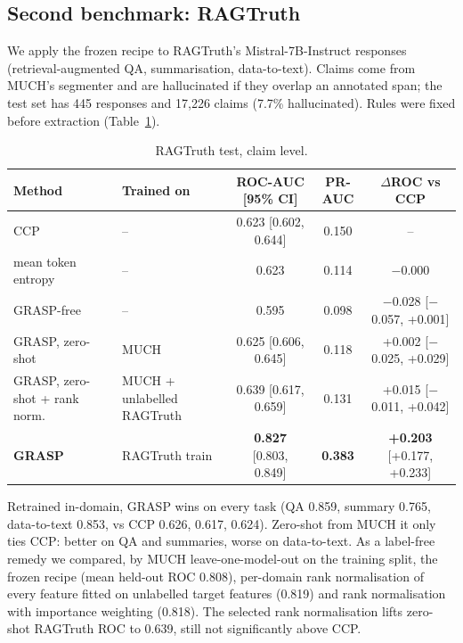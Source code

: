 \documentclass[11pt]{article}
\begin{document}
\subsection{Second benchmark: RAGTruth}
We apply the frozen recipe to RAGTruth's Mistral-7B-Instruct responses (retrieval-augmented QA,
summarisation, data-to-text). Claims come from MUCH's segmenter and are hallucinated if they overlap
an annotated span; the test set has 445 responses and 17,226 claims (7.7\% hallucinated). Rules were
fixed before extraction (Table~\ref{tab:rag}).
\begin{table}[h]
\centering\small
\begin{tabular}{llccc}
\toprule
Method & Trained on & ROC-AUC [95\% CI] & PR-AUC & $\Delta$ROC vs CCP \\
\midrule
CCP & -- & 0.623 [0.602, 0.644] & 0.150 & -- \\
mean token entropy & -- & 0.623 & 0.114 & $-$0.000 \\
GRASP-free & -- & 0.595 & 0.098 & $-$0.028 [$-$0.057, +0.001] \\
GRASP, zero-shot & MUCH & 0.625 [0.606, 0.645] & 0.118 & +0.002 [$-$0.025, +0.029] \\
GRASP, zero-shot + rank norm. & MUCH + unlabelled RAGTruth & 0.639 [0.617, 0.659] & 0.131 & +0.015 [$-$0.011, +0.042] \\
\textbf{GRASP} & RAGTruth train & \textbf{0.827} [0.803, 0.849] & \textbf{0.383} & \textbf{+0.203} [+0.177, +0.233] \\
\bottomrule
\end{tabular}
\caption{RAGTruth test, claim level.}
\label{tab:rag}
\end{table}
Retrained in-domain, GRASP wins on every task (QA 0.859, summary 0.765, data-to-text 0.853, vs
CCP 0.626, 0.617, 0.624). Zero-shot from MUCH it only ties CCP: better on QA and summaries, worse
on data-to-text. As a label-free remedy we compared, by MUCH leave-one-model-out on the training
split, the frozen recipe (mean held-out ROC 0.808), per-domain rank normalisation of every feature
fitted on unlabelled target features (0.819) and rank normalisation with importance weighting
(0.818). The selected rank normalisation lifts zero-shot RAGTruth ROC to 0.639, still not
significantly above CCP.
\end{document}
